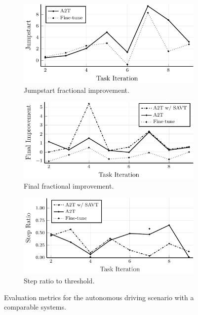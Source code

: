 \begin{figure}
    \centering
    \begin{subfigure}[b]{0.32\textwidth}
        \centering
        \includegraphics[width=\textwidth]{figures/iterative_validation/driving_comparison/jumpstart.pdf}
        \caption{Jumpstart fractional improvement.}
        \label{fig:adc_jumpstart}
    \end{subfigure}
    \hfill
    \begin{subfigure}[b]{0.32\textwidth}
        \centering
        \includegraphics[width=\textwidth]{figures/iterative_validation/driving_comparison/peak_performance.pdf}
        \caption{Final fractional improvement.}
        \label{fig:adc_final}
    \end{subfigure}
    \hfill
    \begin{subfigure}[b]{0.32\textwidth}
        \centering
        \includegraphics[width=\textwidth]{figures/iterative_validation/driving_comparison/steps_to_threshold.pdf}
        \caption{Step ratio to threshold.}
        \label{fig:adc_step}
    \end{subfigure}
    \caption{Evaluation metrics for the autonomous driving scenario with a comparable systems.}
    \label{fig:adc}
\end{figure}


